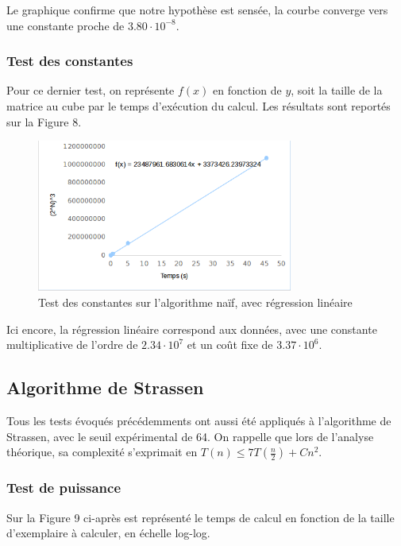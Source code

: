 \documentclass[10pt,a4paper]{article}
\begin{document}
Le graphique confirme que notre hypothèse est sensée, la courbe converge vers une constante proche de $ 3.80 \cdot 10^{-8} $.

\subsubsection{Test des constantes}

Pour ce dernier test, on représente $ f(x) $ en fonction de $ y $, soit la taille de la matrice au cube par le temps d'exécution du calcul. Les résultats sont reportés sur la Figure 8.

\begin{figure}[h!]
	\centering
	\includegraphics[width=0.75\textwidth]{spreadsheet/graph9}
	\caption{Test des constantes sur l'algorithme naïf, avec régression linéaire}
\end{figure}

Ici encore, la régression linéaire correspond aux données, avec une constante multiplicative de l'ordre de  $ 2.34 \cdot 10^{7} $ et un coût fixe de $ 3.37 \cdot 10^{6} $.

\subsection{Algorithme de Strassen}

Tous les tests évoqués précédemments ont aussi été appliqués à l'algorithme de Strassen, avec le seuil expérimental de 64. On rappelle que lors de l'analyse théorique, sa complexité s'exprimait en $ T(n) \leq 7T( \frac{n}{2}) + Cn^{2} $.

\subsubsection{Test de puissance}

Sur la Figure 9 ci-après est représenté le temps de calcul en fonction de la taille d'exemplaire à calculer, en échelle log-log.
\end{document}
